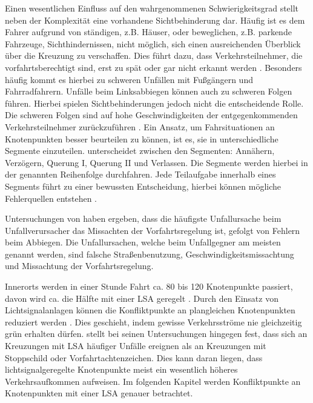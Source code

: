 Einen wesentlichen Einfluss auf den wahrgenommenen Schwierigkeitsgrad stellt neben der Komplexität eine vorhandene Sichtbehinderung dar. Häufig ist es dem Fahrer aufgrund von ständigen, z.B. Häuser, oder beweglichen, z.B. parkende Fahrzeuge, Sichthindernissen, nicht möglich, sich einen ausreichenden Überblick über die Kreuzung zu verschaffen. Dies führt dazu, dass Verkehrsteilnehmer, die vorfahrtsberechtigt sind, erst zu spät oder gar nicht erkannt werden \parencite[S. 9]{Mages.2008}. Besonders häufig kommt es hierbei zu schweren Unfällen mit Fußgängern und Fahrradfahrern. Unfälle beim Linksabbiegen können auch zu schweren Folgen führen. Hierbei spielen Sichtbehinderungen jedoch nicht die entscheidende Rolle. Die schweren Folgen sind auf  hohe Geschwindigkeiten der entgegenkommenden Verkehrsteilnehmer zurückzuführen \parencite[S. 417]{AbdelAty.2005}. Ein Ansatz, um Fahrsituationen an Knotenpunkten besser beurteilen zu können, ist es, sie in unterschiedliche Segmente einzuteilen. \Textcite[S. 112]{Gerstenberger.17.02.2015} unterscheidet zwischen den Segmenten: Annähern, Verzögern, Querung I, Querung II und Verlassen. Die Segmente werden hierbei in der genannten Reihenfolge durchfahren. Jede Teilaufgabe innerhalb eines Segments führt zu einer bewussten Entscheidung, hierbei können mögliche Fehlerquellen entstehen \parencite[S. 25]{Gerstenberger.17.02.2015}. %

Untersuchungen von \Textcite[S. 112]{Gerstenberger.17.02.2015} haben ergeben, dass die häufigste Unfallursache beim Unfallverursacher das Missachten der Vorfahrtsregelung ist, gefolgt von Fehlern beim Abbiegen. Die Unfallursachen, welche beim Unfallgegner am meisten genannt werden, sind falsche Straßenbenutzung, Geschwindigkeitsmissachtung und Missachtung der Vorfahrtsregelung. 

Innerorts werden in einer Stunde Fahrt ca. 80 bis 120 Knotenpunkte passiert, davon wird ca. die Hälfte mit einer \ac{LSA} geregelt \parencite[S. 114]{Reichart.2001}. Durch den Einsatz von Lichtsignalanlagen können die Konfliktpunkte an plangleichen Knotenpunkten reduziert werden \parencite[S. 83]{Reichart.2001}. Dies geschieht, indem gewisse Verkehrsströme nie gleichzeitig grün erhalten dürfen. \Textcite[S. 417]{AbdelAty.2005} stellt bei seinen Untersuchungen hingegen fest, dass sich an Kreuzungen mit LSA häufiger Unfälle ereignen als an Kreuzungen mit Stoppschild oder Vorfahrtachtenzeichen. Dies kann daran liegen, dass lichtsignalgeregelte Knotenpunkte meist ein wesentlich höheres Verkehrsaufkommen aufweisen. Im folgenden Kapitel werden Konfliktpunkte an Knotenpunkten mit einer \ac{LSA} genauer betrachtet.


